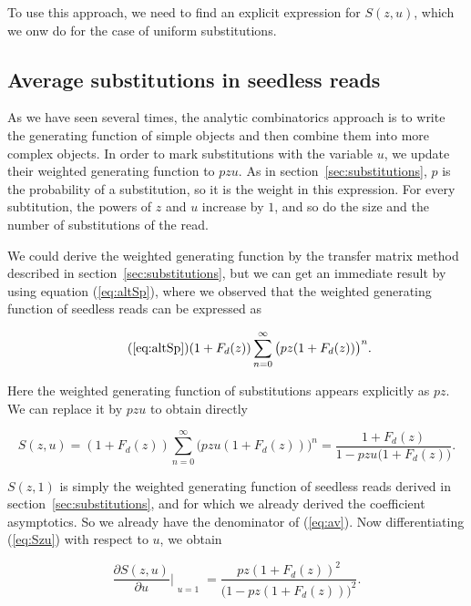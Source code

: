 \documentclass{article}
\begin{document}
To use this approach, we need to find an explicit expression for $S(z,u)$,
which we onw do for the case of uniform substitutions.



\subsection{Average substitutions in seedless reads}
\label{sec:Szu}

As we have seen several times, the analytic combinatorics approach is to
write the generating function of simple objects and then combine them into
more complex objects. In order to mark substitutions with the variable
$u$, we update their weighted generating function to $pzu$. As in
section~\ref{sec:substitutions}, $p$ is the probability of a substitution,
so it is the weight in this expression. For every subtitution, the powers
of $z$ and $u$ increase by $1$, and so do the size and the number of
substitutions of the read.

We could derive the weighted generating function by the transfer matrix
method described in section~\ref{sec:substitutions}, but we can get an
immediate result by using equation (\ref{eq:altSp}), where we observed
that the weighted generating function of seedless reads can be expressed
as

\begin{equation}
\tag{\ref{eq:altSp}}
(1+F_d(z)) \sum_{n=0}^\infty \big( pz(1+F_d(z)) \big)^n.
\end{equation}

Here the weighted generating function of substitutions appears explicitly
as $pz$. We can replace it by $pzu$ to obtain directly

\begin{equation}
\label{eq:Szu}
S(z,u) = (1+F_d(z)) \sum_{n=0}^\infty \big( pzu(1+F_d(z)) \big)^n
= \frac{1+F_d(z)}{1-pzu\big( 1+F_d(z) \big)}.
\end{equation}


$S(z,1)$ is simply the weighted generating function of seedless reads
derived in section~\ref{sec:substitutions}, and for which we already
derived the coefficient asymptotics. So we already have the denominator of
(\ref{eq:av}). Now differentiating (\ref{eq:Szu}) with respect to $u$, we
obtain

\begin{equation}
\label{eq:dSdu}
\frac{\partial S(z,u)}{\partial u} \Bigr|_{\substack{\\u=1}} = 
\frac{pz(1+F_d(z))^2}{\big( 1 - pz(1+F_d(z)) \big)^2}.
\end{equation}
\end{document}
